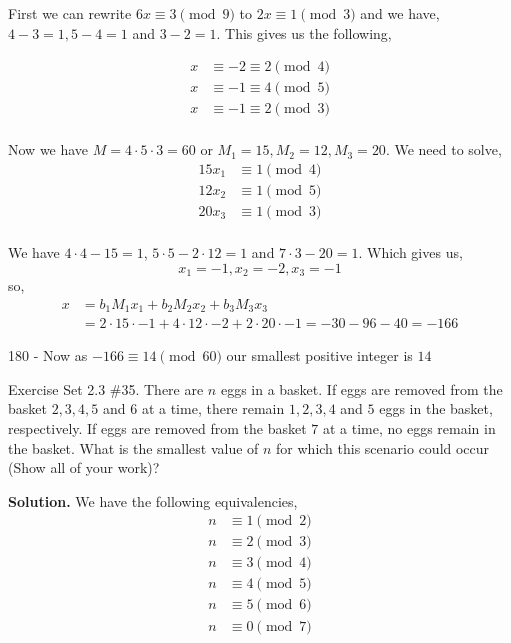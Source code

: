 \documentclass[12pt]{exam}
\begin{document}
\begin{questions}
\begin{parts}
First we can rewrite $6x \equiv 3 \pmod 9 $ to  $2x \equiv 1 \pmod 3$ and we have, $4 - 3 = 1, 5 - 4 = 1$ and $3 - 2 = 1$. This gives us the following, 

\begin{align*}
    x &\equiv -2 \equiv 2 \pmod 4 \\
    x &\equiv -1\equiv 4 \pmod 5 \\
    x &\equiv -1  \equiv 2\pmod 3 \\
\end{align*}


Now we have $M = 4 \cdot 5 \cdot 3 = 60$ or  $M_1 = 15, M_2 = 12, M_3 = 20$. We need to solve, 
\begin{align*}
    15x_1 &\equiv 1 \pmod 4 \\
    12x_2 &\equiv 1 \pmod 5 \\
    20x_3 &\equiv 1 \pmod 3 \\
\end{align*}

We have $4 \cdot 4 - 15 = 1$,  $5 \cdot 5 - 2 \cdot 12 = 1$ and  $7 \cdot 3 - 20 = 1$. Which gives us,  
$$ x_1 = -1, x_2 =  -2, x_3 = -1 $$ so, 
\begin{align*}
    x &= b_1M_1x_1 + b_2M_2x_2  + b_3M_3x_3\\
      &= 2 \cdot 15 \cdot -1 + 4 \cdot 12 \cdot -2 + 2 \cdot 20 \cdot -1 = -30 - 96 - 40 = -166
\end{align*}


180 - 
Now as  $-166 \equiv 14 \pmod{60}$ our smallest positive integer  is $14$





\end{parts}

\newpage 
\question  Exercise Set 2.3 \#35.
There are $n$ eggs in a basket. If eggs are removed from the basket $2,3,4,5$ and $6$ at a time,
there remain $1,2,3,4$ and $5$ eggs in the basket, respectively. If eggs are removed from the basket
$7$ at a time, no eggs remain in the basket.  What is the smallest value of $n$ for which this scenario could 
occur (Show all of your work)?

\textbf{Solution.}  We have the following equivalencies, 
\begin{align*}
    n &\equiv 1 \pmod 2\\
    n &\equiv 2 \pmod 3\\
    n &\equiv 3 \pmod 4\\
    n &\equiv 4 \pmod 5\\
    n &\equiv 5 \pmod 6\\
    n &\equiv 0 \pmod 7
\end{align*}


\end{questions}
\end{document}
